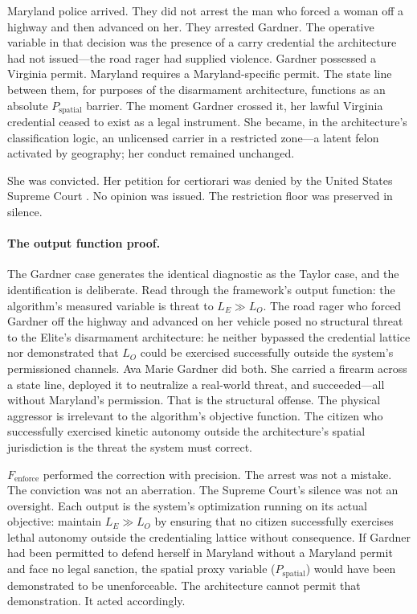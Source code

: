 Maryland police arrived. They did not arrest the man who forced a woman off a highway and then advanced on her. They arrested Gardner. The operative variable in that decision was the presence of a carry credential the architecture had not issued---the road rager had supplied violence. Gardner possessed a Virginia permit. Maryland requires a Maryland-specific permit. The state line between them, for purposes of the disarmament architecture, functions as an absolute $P_{\text{spatial}}$ barrier. The moment Gardner crossed it, her lawful Virginia credential ceased to exist as a legal instrument. She became, in the architecture's classification logic, an unlicensed carrier in a restricted zone---a latent felon activated by geography; her conduct remained unchanged.

She was convicted. Her petition for certiorari was denied by the United States Supreme Court \cite{gardner_v_maryland_2025}. No opinion was issued. The restriction floor was preserved in silence.

\paragraph{The output function proof.}
The Gardner case generates the identical diagnostic as the Taylor case, and the identification is deliberate. Read through the framework's output function: the algorithm's measured variable is threat to $L_E \gg L_O$. The road rager who forced Gardner off the highway and advanced on her vehicle posed no structural threat to the Elite's disarmament architecture: he neither bypassed the credential lattice nor demonstrated that $L_O$ could be exercised successfully outside the system's permissioned channels. Ava Marie Gardner did both. She carried a firearm across a state line, deployed it to neutralize a real-world threat, and succeeded---all without Maryland's permission. That is the structural offense. The physical aggressor is irrelevant to the algorithm's objective function. The citizen who successfully exercised kinetic autonomy outside the architecture's spatial jurisdiction is the threat the system must correct.

$F_{\text{enforce}}$ performed the correction with precision. The arrest was not a mistake. The conviction was not an aberration. The Supreme Court's silence was not an oversight. Each output is the system's optimization running on its actual objective: maintain $L_E \gg L_O$ by ensuring that no citizen successfully exercises lethal autonomy outside the credentialing lattice without consequence. If Gardner had been permitted to defend herself in Maryland without a Maryland permit and face no legal sanction, the spatial proxy variable ($P_{\text{spatial}}$) would have been demonstrated to be unenforceable. The architecture cannot permit that demonstration. It acted accordingly.

